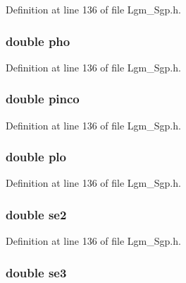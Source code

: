 Definition at line 136 of file Lgm\_\-Sgp.h.\hypertarget{struct___sgp_info_6455bb211516d721115c708d51f5beec}{
\subsubsection[{pho}]{\setlength{\rightskip}{0pt plus 5cm}double {\bf pho}}}
\label{struct___sgp_info_6455bb211516d721115c708d51f5beec}




Definition at line 136 of file Lgm\_\-Sgp.h.\hypertarget{struct___sgp_info_3063db50044a10a1805f09ec06904db9}{
\subsubsection[{pinco}]{\setlength{\rightskip}{0pt plus 5cm}double {\bf pinco}}}
\label{struct___sgp_info_3063db50044a10a1805f09ec06904db9}




Definition at line 136 of file Lgm\_\-Sgp.h.\hypertarget{struct___sgp_info_7ad4147f4ca4a74315a064ca7b1817f5}{
\subsubsection[{plo}]{\setlength{\rightskip}{0pt plus 5cm}double {\bf plo}}}
\label{struct___sgp_info_7ad4147f4ca4a74315a064ca7b1817f5}




Definition at line 136 of file Lgm\_\-Sgp.h.\hypertarget{struct___sgp_info_5a7f7150e4e1afe1ca272a66d2618936}{
\subsubsection[{se2}]{\setlength{\rightskip}{0pt plus 5cm}double {\bf se2}}}
\label{struct___sgp_info_5a7f7150e4e1afe1ca272a66d2618936}




Definition at line 136 of file Lgm\_\-Sgp.h.\hypertarget{struct___sgp_info_7881e839568571e07c209edcdf9ac468}{
\subsubsection[{se3}]{\setlength{\rightskip}{0pt plus 5cm}double {\bf se3}}}
\label{struct___sgp_info_7881e839568571e07c209edcdf9ac468}




